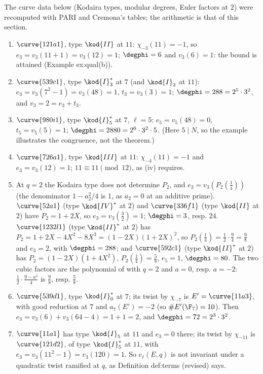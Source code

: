 \begin{example}\label{ex:rings:paper-values}
The curve data below (Kodaira types, modular degrees, Euler factors at $2$) were recomputed with PARI and Cremona's tables; the
arithmetic is that of this section.
\begin{enumerate}[label=(\alph*)]
\item $\curve{121a1}$, type $\kod{II}$ at $11$: $\chi_{-3}(11)=-1$, so $e_3=v_3(11+1)=v_3(12)=1$; $\degphi=6$ and $v_3(6)=1$: the bound is attained (Example ex:qual(b)).
\item $\curve{539c1}$, type $\kod{I}_3^*$ at $7$ (and $\kod{I}_2$ at $11$): $e_3=v_3(7^2-1)=v_3(48)=1$, $t_3=v_3(3)=1$; $\degphi=288=2^5\cdot3^2$, and $v_3=2=e_3+t_3$.
\item $\curve{980i1}$, type $\kod{I}_5^*$ at $7$, $\ell=5$: $e_5=v_5(48)=0$, $t_5=v_5(5)=1$; $\degphi=2880=2^6\cdot3^2\cdot5$. (Here $5\mid N$, so the example illustrates the
congruence, not the theorem.)
\item $\curve{726a1}$, type $\kod{III}$ at $11$: $\chi_{-4}(11)=-1$ and $e_3=v_3(12)=1$; $11\equiv11\pmod{12}$, as (iv) requires.
\item At $q=2$ the Kodaira type does not determine $P_2$, and $e_3=v_3(P_2(\frac14))$ (the denominator $1-a_2^2/4$ is $1$, as $a_2=0$ at an additive
prime). $\curve{52a1}$ (type $\kod{IV}^*$ at $2$) and $\curve{336f1}$ (type $\kod{II}$ at $2$) have $P_2=1+2X$, so $e_3=v_3(\frac32)=1$; $\degphi=3$, resp. $24$. $\curve{1232l1}$
(type $\kod{II}^*$ at $2$) has $P_2=1+2X-4X^2-8X^3=(1-2X)(1+2X)^2$, so $P_2(\frac14)=\frac12\cdot\frac94=\frac98$ and $e_3=2$, with $\degphi=288$; and $\curve{592c1}$ (type
$\kod{II}^*$ at $2$) has $P_2=(1-2X)(1+4X^2)$, $P_2(\frac14)=\frac58$, $e_5=1$, $\degphi=80$. The two cubic factors are the polynomial of
 with $q=2$ and $a=0$, resp. $a=-2$: $\frac12\cdot\frac{9-a^2}4$ is $\frac98$, resp. $\frac58$.
\item $\curve{539d1}$, type $\kod{I}_0^*$ at $7$; its twist by $\chi_{-7}$ is $E'=\curve{11a3}$, with good reduction at $7$ and $a_7(E')=-2$ (so $\#E'(\F_7)=10$). Then
$e_3=v_3(6)+v_3(64-4)=1+1=2$, and $\degphi=72=2^3\cdot3^2$.
\item $\curve{11a1}$ has type $\kod{I}_5$ at $11$ and $e_3=0$ there; its twist by $\chi_{-11}$ is $\curve{121d2}$, of type $\kod{I}_5^*$ at $11$, with $e_3=v_3(11^2-1)=v_3(120)=1$. So
$e_\ell(E,q)$ is not invariant under a quadratic twist ramified at $q$, as Definition def:terms (revised) says.
\end{enumerate}
\end{example}

